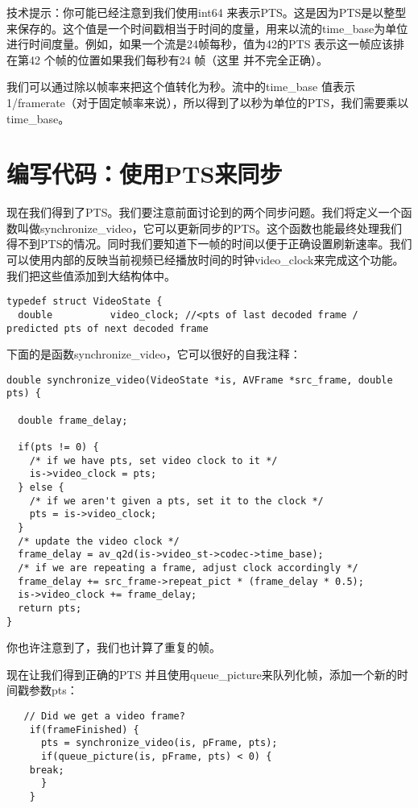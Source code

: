 技术提示：你可能已经注意到我们使用int64 来表示PTS。这是因为PTS是以整型来保存的。这个值是一个时间戳相当于时间的度量，用来以流的time_base为单位进行时间度量。例如，如果一个流是24帧每秒，值为42的PTS 表示这一帧应该排在第42 个帧的位置如果我们每秒有24 帧（这里 并不完全正确）。

我们可以通过除以帧率来把这个值转化为秒。流中的time_base 值表示1/framerate（对于固定帧率来说），所以得到了以秒为单位的PTS，我们需要乘以time_base。

\section{编写代码：使用PTS来同步}

现在我们得到了PTS。我们要注意前面讨论到的两个同步问题。我们将定义一个函数叫做synchronize_video，它可以更新同步的PTS。这个函数也能最终处理我们得不到PTS的情况。同时我们要知道下一帧的时间以便于正确设置刷新速率。我们可以使用内部的反映当前视频已经播放时间的时钟video_clock来完成这个功能。我们把这些值添加到大结构体中。

 \begin{lstlisting}
typedef struct VideoState {
  double          video_clock; //<pts of last decoded frame / predicted pts of next decoded frame
\end{lstlisting}

下面的是函数synchronize_video，它可以很好的自我注释：

\begin{lstlisting}
double synchronize_video(VideoState *is, AVFrame *src_frame, double pts) {

  double frame_delay;

  if(pts != 0) {
    /* if we have pts, set video clock to it */
    is->video_clock = pts;
  } else {
    /* if we aren't given a pts, set it to the clock */
    pts = is->video_clock;
  }
  /* update the video clock */
  frame_delay = av_q2d(is->video_st->codec->time_base);
  /* if we are repeating a frame, adjust clock accordingly */
  frame_delay += src_frame->repeat_pict * (frame_delay * 0.5);
  is->video_clock += frame_delay;
  return pts;
}
\end{lstlisting}

你也许注意到了，我们也计算了重复的帧。

现在让我们得到正确的PTS 并且使用queue_picture来队列化帧，添加一个新的时间戳参数pts：

\begin{lstlisting}
   // Did we get a video frame?
    if(frameFinished) {
      pts = synchronize_video(is, pFrame, pts);
      if(queue_picture(is, pFrame, pts) < 0) {
    break;
      }
    }
\end{lstlisting}

